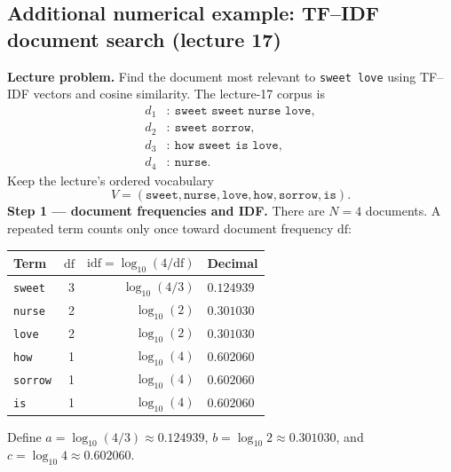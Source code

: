 \subsection*{Additional numerical example: TF--IDF document search (lecture 17)}
\textbf{Lecture problem.} Find the document most relevant to \texttt{sweet love} using TF--IDF vectors and cosine similarity. The lecture-17 corpus is
\[
\begin{aligned}
d_1&:\ \texttt{sweet sweet nurse love},\\
d_2&:\ \texttt{sweet sorrow},\\
d_3&:\ \texttt{how sweet is love},\\
d_4&:\ \texttt{nurse}.
\end{aligned}
\]
Keep the lecture's ordered vocabulary
\[V=(\texttt{sweet},\texttt{nurse},\texttt{love},\texttt{how},\texttt{sorrow},\texttt{is}).\]
\textbf{Step 1 --- document frequencies and IDF.} There are $N=4$ documents. A repeated term counts only once toward document frequency $\mathrm{df}$:
\begin{center}\small
\begin{tabular}{@{}lrrl@{}}\toprule
Term & $\mathrm{df}$ & $\mathrm{idf}=\log_{10}(4/\mathrm{df})$ & Decimal\\\midrule
\texttt{sweet} & 3 & $\log_{10}(4/3)$ & $0.124939$\\
\texttt{nurse} & 2 & $\log_{10}(2)$ & $0.301030$\\
\texttt{love} & 2 & $\log_{10}(2)$ & $0.301030$\\
\texttt{how} & 1 & $\log_{10}(4)$ & $0.602060$\\
\texttt{sorrow} & 1 & $\log_{10}(4)$ & $0.602060$\\
\texttt{is} & 1 & $\log_{10}(4)$ & $0.602060$\\\bottomrule
\end{tabular}\end{center}
Define $a=\log_{10}(4/3)\approx0.124939$, $b=\log_{10}2\approx0.301030$, and $c=\log_{10}4\approx0.602060$.

